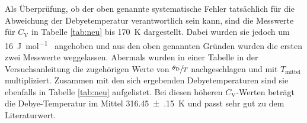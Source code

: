 Als Überprüfung, ob der oben genannte systematische Fehler tatsächlich für
die Abweichung der Debyetemperatur verantwortlich sein kann, sind die
Messwerte für $C_\text{V}$ in Tabelle \ref{tab:neu} bis \SI{170}{\kelvin}
dargestellt. Dabei wurden sie jedoch um \SI{16}{\joule\per\mole\grd}
angehoben und aus den oben genannten Gründen wurden die ersten zwei Messwerte
weggelassen. Abermals wurden in einer Tabelle in der Versuchsanleitung
\cite[p.~5]{anleitung} die zugehörigen Werte von $\sfrac{\theta_\text{D}}{T}$
nachgeschlagen und mit $T_\text{mittel}$ multipliziert. Zusammen mit den
sich ergebenden Debyetemperaturen sind sie ebenfalls in Tabelle \ref{tab:neu}
aufgelistet. Bei diesen höheren $C_\text{V}$-Werten beträgt die
Debye-Temperatur im Mittel \SI{316.45(15)}{\kelvin} und passt sehr gut zu
dem Literaturwert.


